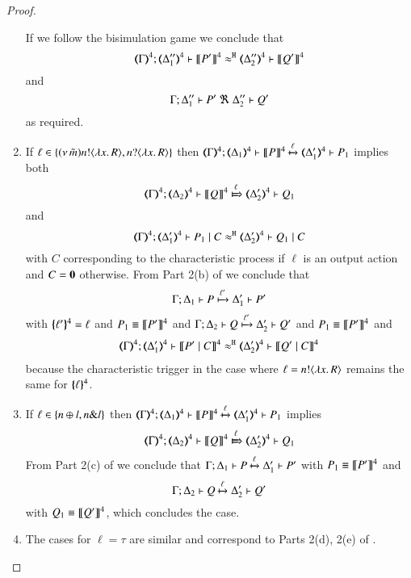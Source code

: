 \begin{proof}
\begin{enumerate}
		If we follow the bisimulation game we conclude that
		\[
		\horel{\tmap{\Gamma}{4}}{\tmap{\Delta_1''}{4}}{\pmap{P'}{4}}{\hwb}{\tmap{\Delta_2''}{4}}{\pmap{Q'}{4}}
		\]
		and
		\[
		\horel{\Gamma}{\Delta_1''}{P'}{\ \Re\ }{\Delta_2''}{Q'}
		\]
		as required.
		\item	If $\ell \in \{(\nu\, \tilde{m}) n ! \langle \lambda x.\,R \rangle, n ? \langle \lambda x.\,R \rangle\}$
				then
				$
				\horel{\tmap{\Gamma}{4}}{\tmap{\Delta_1}{4}}{\pmap{P}{4}}{\hby{\ell}}{\tmap{\Delta_1'}{4}}{P_1}
				$
				implies both 
				\[
				\horel{\tmap{\Gamma}{4}}{\tmap{\Delta_2}{4}}{\pmap{Q}{4}}{\Hby{\ell}}{\tmap{\Delta_2'}{4}}{Q_1}
				\]
				and
				\[
				\horel{\tmap{\Gamma}{4}}{\tmap{\Delta_1'}{4}}{P_1 \Par C}{\hwb}{\tmap{\Delta_2'}{4}}{Q_1 \Par C}
				\]
				with $C$ corresponding to the characteristic process if $\ell$ is an output action and $C = \mathbf{0}$ otherwise.
				From Part 2(b) of  we conclude that
				$$\Gamma; \Delta_1 \vdash P \xmapsto{\ell'} \Delta_1' \vdash P'$$
				with $\{\!\!\{\ell'\}\!\!\}^{4} = \ell$ and $P_1 \equiv \llbracket P'\rrbracket^4$
				and
				$\Gamma; \Delta_2 \vdash Q \xmapsto{\ell'} \Delta_2' \vdash Q'$
				and $P_1 \equiv \llbracket P'\rrbracket^4$ and
				\begin{eqnarray*}
					\horel{\tmap{\Gamma}{4}}{\tmap{\Delta_1'}{4}}{\pmap{P' \Par C}{4}}{\hwb}{\tmap{\Delta_2'}{4}}{\pmap{Q' \Par C}{4}}
				\end{eqnarray*}
				because the characteristic trigger in the case where $\ell = n ! \langle \lambda x.\,R \rangle$ remains the same
				for $\{\!\!\{\ell\}\!\!\}^{4}$.
				
		\item	If $\ell \in \{n \oplus l, n \& l\}$
				then
				$
				\horel{\tmap{\Gamma}{4}}{\tmap{\Delta_1}{4}}{\pmap{P}{4}}{\hby{\ell}}{\tmap{\Delta_1'}{4}}{P_1}
				$
				implies
				\[
				\horel{\tmap{\Gamma}{4}}{\tmap{\Delta_2}{4}}{\pmap{Q}{4}}{\Hby{\ell}}{\tmap{\Delta_2'}{4}}{Q_1}
				\]
				From Part 2(c) of  we conclude that
				$	
				\Gamma; \Delta_1 \vdash P \xmapsto{\ell} \Delta_1' \vdash P'
				$
				with $P_1 \equiv \llbracket P'\rrbracket^4$
				and
				\[	
				\Gamma; \Delta_2 \vdash Q \xmapsto{\ell} \Delta_2' \vdash Q'
				\]
				with $Q_1 \equiv \llbracket Q'\rrbracket^4$,
				which concludes the case.

		\item	The cases for $\ell = \tau$ are similar
				and correspond to Parts 2(d), 2(e) of .
	\end{enumerate}
			

\end{proof}
